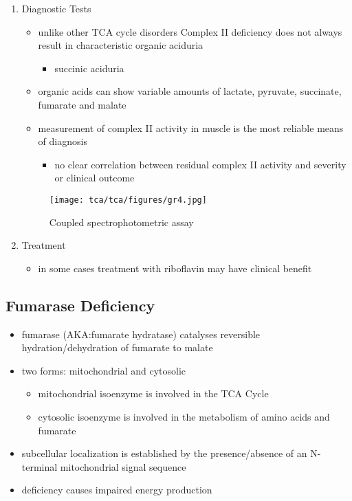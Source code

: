 \documentclass{scrartcl}
\begin{document}
\begin{enumerate}
\item Diagnostic Tests
\label{sec:org4b4124f}
\begin{itemize}
\item unlike other TCA cycle disorders Complex II deficiency does not always
result in characteristic organic aciduria
\begin{itemize}
\item succinic aciduria
\end{itemize}
\item organic acids can show variable amounts of lactate, pyruvate, succinate, fumarate and malate
\item measurement of complex II activity in muscle is the most reliable
means of diagnosis
\begin{itemize}
\item no clear correlation between residual complex II activity and
severity or clinical outcome
\end{itemize}
\end{itemize}

\begin{figure}[htbp]
\centering
\texttt{[image: tca/tca/figures/gr4.jpg]}
\caption{\label{fig:org4b6036f}Coupled spectrophotometric assay}
\end{figure}

\item Treatment
\label{sec:org9e72440}
\begin{itemize}
\item in some cases treatment with riboflavin may have clinical benefit
\end{itemize}
\end{enumerate}


\subsection{Fumarase Deficiency}
\label{sec:org2596fdd}
\begin{itemize}
\item fumarase (AKA:fumarate hydratase) catalyses reversible
hydration/dehydration of fumarate to malate
\end{itemize}
\begin{itemize}
\item two forms: mitochondrial and cytosolic
\begin{itemize}
\item mitochondrial isoenzyme is involved in the TCA Cycle
\item cytosolic isoenzyme is involved in the metabolism of amino acids and fumarate
\end{itemize}
\item subcellular localization is established by the presence/absence of an N-terminal mitochondrial signal
sequence
\item deficiency causes impaired energy production
\end{itemize}
\end{document}
